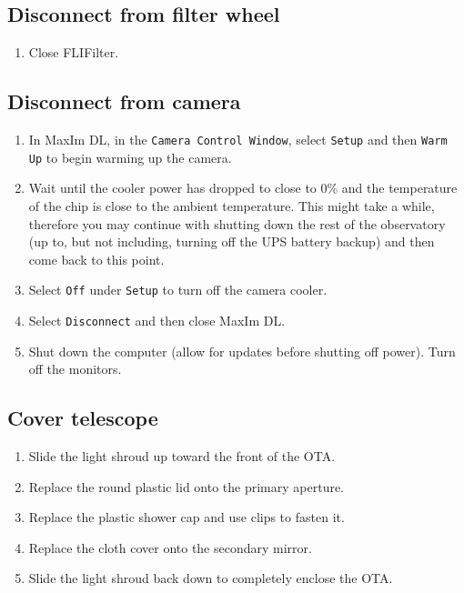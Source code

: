 \documentclass{article}
\begin{document}
	\subsection{Disconnect from filter wheel}
	\label{sec:disconnect-from-filter-wheel}
	
	\begin{enumerate}
		
		\item Close FLIFilter.
		
	\end{enumerate}
	
	\subsection{Disconnect from camera}
	\label{sec:disconnect-from-camera}
	
	\begin{enumerate}
		
		\item In MaxIm DL, in the \texttt{Camera Control Window}, select \texttt{Setup} and then \texttt{Warm Up} to begin warming up the camera.
		
		\item Wait until the cooler power has dropped to close to 0\% and the temperature of the chip is close to the ambient temperature. This might take a while, therefore you may continue with shutting down the rest of the observatory (up to, but not including, turning off the UPS battery backup) and then come back to this point.
		
		\item Select \texttt{Off} under \texttt{Setup} to turn off the camera cooler.
		
		\item Select \texttt{Disconnect} and then close MaxIm DL.
		
		\item Shut down the computer (allow for updates before shutting off power). Turn off the monitors.
		
	\end{enumerate}
	
	\subsection{Cover telescope}
	\label{sec:cover-telescope}
	
	\begin{enumerate}
		
		\item Slide the light shroud up toward the front of the OTA.
		
		\item Replace the round plastic lid onto the primary aperture.
		
		\item Replace the plastic shower cap and use clips to fasten it.
		
		\item Replace the cloth cover onto the secondary mirror.
		
		\item Slide the light shroud back down to completely enclose the OTA.
		
	\end{enumerate}
	
\end{document}
